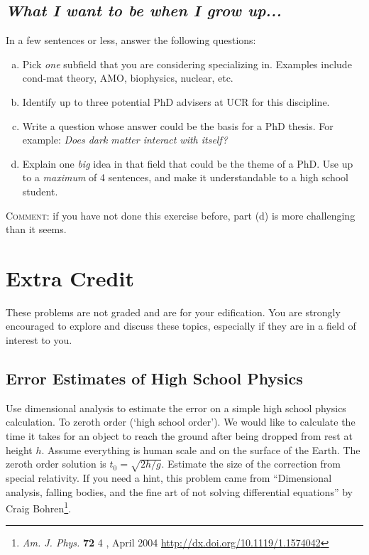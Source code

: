 \documentclass[12pt]{article}
\numberwithin{equation}{subsection}    %
\begin{document}
\subsection{\emph{What I want to be when I grow up...}}

In a few sentences or less, answer the following questions:
\begin{enumerate}[(a)]
\item Pick \emph{one} subfield that you are considering specializing in. Examples include cond-mat theory, AMO, biophysics, nuclear, etc.
\item Identify up to three potential PhD advisers at UCR for this discipline.
\item Write a question whose answer could be the basis for a PhD thesis. For example: \emph{Does dark matter interact with itself?}
\item Explain one \emph{big} idea in that field that could be the theme of a PhD. Use up to a \emph{maximum} of 4 sentences, and make it understandable to a high school student. 
\end{enumerate}

\textsc{Comment}: if you have not done this exercise before, part (d) is more challenging than it seems. 



\section{Extra Credit}

These problems are not graded and are for your edification. You are strongly encouraged to explore and discuss these topics, especially if they are in a field of interest to you.

\subsection{Error Estimates of High School Physics}

Use dimensional analysis to estimate the error on a simple high school physics calculation. To zeroth order (`high school order'). We would like to calculate the time it takes for an object to reach the ground after being dropped from rest at height $h$. Assume everything is human scale and on the surface of the Earth. The zeroth order solution is $t_0 = \sqrt{2h/g}$. Estimate the size of the correction from special relativity. If you need a hint, this problem came from ``Dimensional analysis, falling bodies, and the fine art of not solving differential equations'' by Craig Bohren\footnote{\emph{Am. J. Phys.} \textbf{72}  4 , April 2004 \url{http://dx.doi.org/10.1119/1.1574042}}. 
\end{document}
